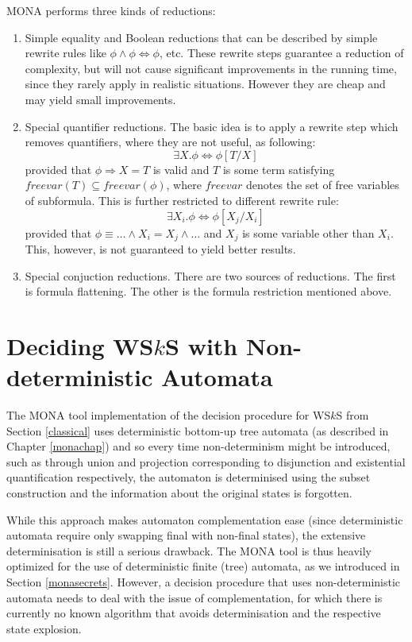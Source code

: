 MONA performs three kinds of reductions:
\begin{enumerate}
 \item Simple equality and Boolean reductions that can be described by simple
 rewrite rules like $\phi \wedge \phi \Leftrightarrow \phi$, etc. These rewrite
 steps guarantee a reduction of complexity, but will not cause significant
 improvements in the running time, since they rarely apply in realistic
 situations. However they are cheap and may yield small improvements.

\item Special quantifier reductions. The basic idea is to apply a rewrite step
which removes quantifiers, where they are not useful, as following: 
\begin{equation}\exists X
. \phi \Leftrightarrow \phi[T/X]\end{equation} provided that $\phi \Rightarrow
X = T$ is valid and $T$ is some term satisfying $freevar(T) \subseteq freevar(\phi)$,
where $freevar$ denotes the set of free variables of subformula. This is further
restricted to different rewrite rule: \begin{equation} \exists X_i . \phi \Leftrightarrow
\phi[X_j/X_i]\end{equation} provided that $\phi \equiv \ldots \wedge X_i = X_j \wedge
\ldots$ and $X_j$ is some variable other than $X_i$. This, however, is not
guaranteed to yield better results.

\item Special conjuction reductions. There are two sources of reductions. The
first is formula flattening. The other is  the formula restriction mentioned
above.
\end{enumerate}

 \chapter{Deciding WS$k$S with Non-deterministic Automata}\label{our}

The \textsc{MONA} tool implementation of the decision procedure for WS$k$S from
Section \ref{classical} uses deterministic bottom-up tree automata (as described
in Chapter \ref{monachap}) and so every time non-determinism might be
introduced, such as through union and projection corresponding to disjunction
and existential quantification respectively, the automaton is determinised using the
subset construction and the information about the original states is forgotten.

While this approach makes automaton complementation ease (since deterministic
automata require only swapping final with non-final states), the extensive
determinisation is still a serious drawback. The \textsc{MONA} tool is
thus heavily optimized for the use of deterministic finite (tree)
automata, as we introduced in Section \ref{monasecrets}. However, a decision
procedure that uses non-deterministic automata needs to deal with the issue of
complementation, for which there is currently no known algorithm that avoids
determinisation and the respective state explosion.

